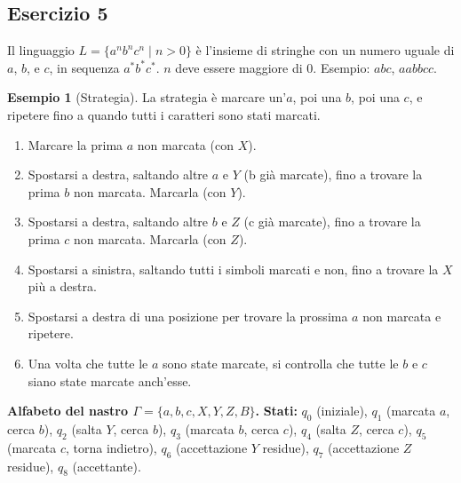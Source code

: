 \documentclass[a4paper]{article}
\theoremstyle{definition} %
\newtheorem{example}{Esempio}
\begin{document}
\subsection{Esercizio 5}
Il linguaggio $L = \{a^n b^n c^n \mid n > 0\}$ è l'insieme di stringhe con un numero uguale di $a$, $b$, e $c$, in sequenza $a^*b^*c^*$. $n$ deve essere maggiore di $0$. Esempio: $abc$, $aabbcc$.

\begin{example}[Strategia]
La strategia è marcare un'$a$, poi una $b$, poi una $c$, e ripetere fino a quando tutti i caratteri sono stati marcati.
\begin{enumerate}
    \item Marcare la prima $a$ non marcata (con $X$).
    \item Spostarsi a destra, saltando altre $a$ e $Y$ (b già marcate), fino a trovare la prima $b$ non marcata. Marcarla (con $Y$).
    \item Spostarsi a destra, saltando altre $b$ e $Z$ (c già marcate), fino a trovare la prima $c$ non marcata. Marcarla (con $Z$).
    \item Spostarsi a sinistra, saltando tutti i simboli marcati e non, fino a trovare la $X$ più a destra.
    \item Spostarsi a destra di una posizione per trovare la prossima $a$ non marcata e ripetere.
    \item Una volta che tutte le $a$ sono state marcate, si controlla che tutte le $b$ e $c$ siano state marcate anch'esse.
\end{enumerate}
\end{example}

\noindent \textbf{Alfabeto del nastro $\Gamma = \{a, b, c, X, Y, Z, B\}$.}
\noindent \textbf{Stati:} $q_0$ (iniziale), $q_1$ (marcata $a$, cerca $b$), $q_2$ (salta $Y$, cerca $b$), $q_3$ (marcata $b$, cerca $c$), $q_4$ (salta $Z$, cerca $c$), $q_5$ (marcata $c$, torna indietro), $q_6$ (accettazione $Y$ residue), $q_7$ (accettazione $Z$ residue), $q_8$ (accettante).
\end{document}
